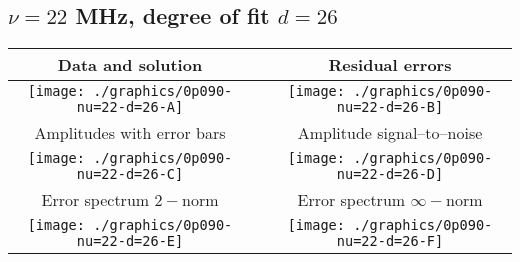 

% 

\clearpage{}
\break{}

\subsection{$\nu = 22$ MHz, degree of fit $d = 26$}

\begin{table}[h]
    \begin{center}
        \begin{tabular}{ccc}
            Data and solution & \quad & Residual errors \\\hline
            \texttt{[image: ./graphics/0p090-nu=22-d=26-A]} &&
            \texttt{[image: ./graphics/0p090-nu=22-d=26-B]} \\[15pt]
            Amplitudes with error bars && Amplitude signal--to--noise \\\hline
            \texttt{[image: ./graphics/0p090-nu=22-d=26-C]} &&
            \texttt{[image: ./graphics/0p090-nu=22-d=26-D]} \\[15pt]
            Error spectrum $2-$norm && Error spectrum $\infty-$norm \\\hline
            \texttt{[image: ./graphics/0p090-nu=22-d=26-E]} &&
            \texttt{[image: ./graphics/0p090-nu=22-d=26-F]} \\[15pt]
        \end{tabular}
    \end{center}
\label{fig:elev=90, nu=22}
\end{table}



\endinput
